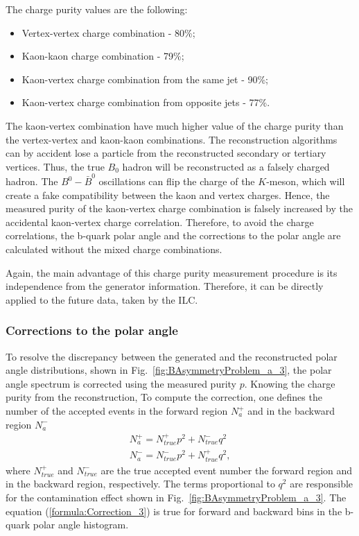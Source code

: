 The charge purity values are the following:
\begin{itemize}
	\item Vertex-vertex charge combination - 80\%;
	\item Kaon-kaon charge combination  - 79\%;
	\item Kaon-vertex charge combination from the same jet - 90\%;
	\item Kaon-vertex charge combination from opposite jets - 77\%.
\end{itemize}
The kaon-vertex combination have much higher value of the charge purity than the vertex-vertex and kaon-kaon combinations. 
The reconstruction algorithms can by accident lose a particle from the reconstructed secondary or tertiary vertices. 
Thus, the true $B_0$ hadron will be reconstructed as a falsely charged hadron.
The $B^0-\bar{B}^0$ oscillations can flip the charge of the $K$-meson, which will create a fake compatibility between the kaon and vertex charges.
Hence, the measured purity of the kaon-vertex charge combination is falsely increased by the accidental kaon-vertex charge correlation.
Therefore, to avoid the charge correlations, the b-quark polar  angle and the corrections to the polar angle are calculated without the mixed charge combinations.

Again, the main advantage of this charge purity measurement procedure is its independence from the generator information. 
Therefore, it can be directly applied to the future data, taken by the ILC.


\subsubsection{Corrections to the polar angle}
To resolve the discrepancy between the generated and the reconstructed polar angle distributions, shown in Fig.~\ref{fig:BAsymmetryProblem_a_3}, the polar angle spectrum is corrected using the measured purity $p$.
Knowing the charge purity from the reconstruction, 
To compute the correction, one defines the number of the accepted events in the forward region $N_a^+$ and in the backward region $N_a^-$ 
\begin{equation}
\begin{array}{l}
N_a^+ =  N^+_{true}p^2 + N^-_{true}q^2\\
N_a^- =  N^-_{true}p^2 + N^+_{true}q^2,
\end{array}
\label{formula:Correction_3}
\end{equation}
where $N_{true}^+$ and  $N_{true}^-$ are the true accepted event number the forward region and in the backward region, respectively.
The terms proportional to $q^2$ are responsible for the contamination effect shown in Fig.~\ref{fig:BAsymmetryProblem_a_3}.
The equation (\ref{formula:Correction_3}) is true for forward and backward bins in the b-quark polar angle histogram.

